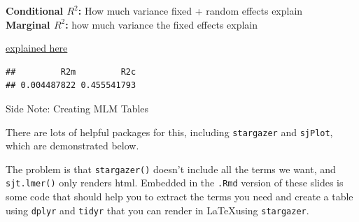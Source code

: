 \begin{frame}[fragile]

\small
\textbf{Conditional $R^2$:} How much variance fixed + random effects
explain\\
\textbf{Marginal $R^2$:} how much variance the fixed effects explain

\href{https://jonlefcheck.net/2013/03/13/r2-for-linear-mixed-effects-models/}{explained
here}

\begin{Shaded}
\begin{Highlighting}[]
\OperatorTok{::}
\end{Highlighting}
\end{Shaded}

\begin{verbatim}
##         R2m         R2c 
## 0.004487822 0.455541793
\end{verbatim}

\normalsize

\end{frame}

\begin{frame}[fragile]{Side Note: Creating MLM Tables}

There are lots of helpful packages for this, including
\texttt{stargazer} and \texttt{sjPlot}, which are demonstrated below.\\
\small

\begin{Shaded}
\begin{Highlighting}[]
\OperatorTok{::}
\OperatorTok{::}
\end{Highlighting}
\end{Shaded}

\normalsize

The problem is that \texttt{stargazer()} doesn't include all the terms
we want, and \texttt{sjt.lmer()} only renders html. Embedded in the
\texttt{.Rmd} version of these slides is some code that should help you
to extract the terms you need and create a table using \texttt{dplyr}
and \texttt{tidyr} that you can render in \LaTeX using
\texttt{stargazer}.

\end{frame}

